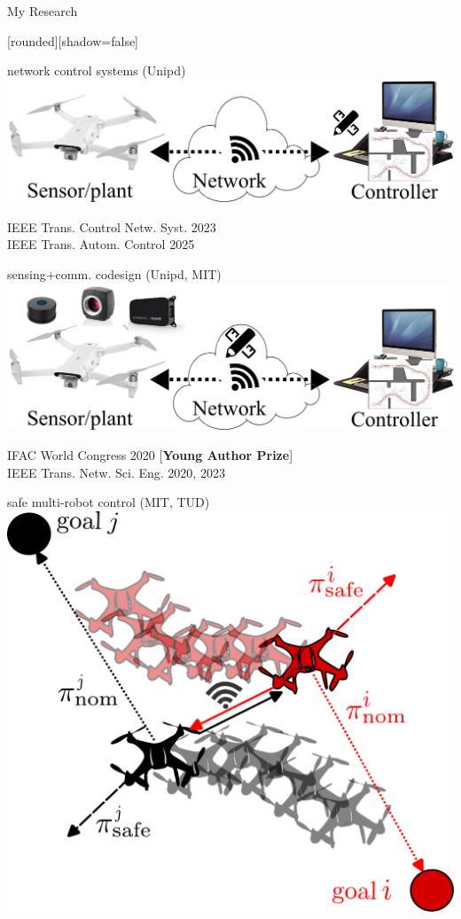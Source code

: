 \documentclass[10pt,xcolor={dvipsnames}]{beamer}
\begin{document}
	\begin{frame}{My Research}
		
		[rounded][shadow=false]
		
		\begin{minipage}[l]{.5\linewidth}
			\centering
			{\small network control systems (Unipd)}\\
			\includegraphics[height=.26\linewidth]{network_control}\\
			\begin{block}
				{\tiny
					IEEE Trans. Control Netw. Syst. 2023\\
					IEEE Trans. Autom. Control 2025}
			\end{block}
		\end{minipage}%
		\begin{minipage}[r]{.5\linewidth}
			\centering
			{\small
				sensing+comm. codesign (Unipd, MIT)}\\
			\includegraphics[height=.26\linewidth]{sensing_comm_codesign}\\
			\begin{block}
				{\tiny
					IFAC World Congress 2020 [\textbf{Young Author Prize}]\\
					IEEE Trans. Netw. Sci. Eng. 2020, 2023}
			\end{block}
		\end{minipage}
		\begin{minipage}[l]{.45\linewidth}
			\centering
			{\small
				safe multi-robot control (MIT, TUD)}\\
			\includegraphics[width=.6\linewidth]{safe_control}

\end{minipage}
\end{frame}
\end{document}
